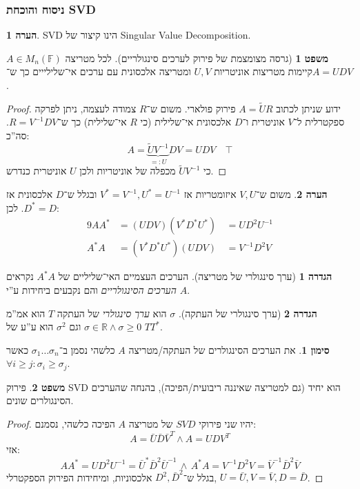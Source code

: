 \documentclass[a4paper]{article}
\newcommand\R     {\mathbb{R}}
\newcommand\F         {\mathbb{F}}
\newcommand\co        {\colon}
\newcommand\sg        {\sigma}
\newcommand\tl    {\tilde}
\newcommand\op    {^{-1}}
\theoremstyle{definition}
\newtheorem{Theorem}{\color{myblue}משפט}
\newtheorem{Definition}{\color{mygreen}הגדרה}
\newtheorem{Remark}{\color{mycyan}הערה}
\newtheorem{Notion}{\color{myred}סימון}
\newcommand\rmark [1] {\begin{Remark}#1\end{Remark}}
\newcommand\noti  [1] {\begin{Notion}#1\end{Notion}}
\begin{document}
	\subsubsection{ניסוח והוכחת SVD}
	\rmark{SVD הינו קיצור של Singular Value Decomposition. }
	\begin{Theorem}[גרסה מצומצמת של פירוק לערכים סינגולריים]
		לכל מטריצה $A \in M_n(\F)$ קיימות מטריצות אוניטריות $U, V$ ומטריצה אלכסונית עם ערכים אי־שלילייים כך ש־$A = UDV$. 
	\end{Theorem}
	\begin{proof}
		ידוע שניתן לכתוב $A = \tl UR$ פירוק פולארי. משום ש־$R$ צמודה לעצמה, ניתן לפרקה ספקטרלית ל־$V$ אוניטרית ו־$D$ אלכסונית אי־שלילית (כי $R$ אי־שלילית) כך ש־$R = V\op DV$. סה''כ: 
		\[ A = \underbrace{\tl UV\op}_{=: U} DV = UDV \quad \top \]
		כי $\tl UV\op$ מכפלה של אוניטריות ולכן $U$ אוניטרית כנדרש. 
	\end{proof}
	
	\rmark{משום ש־$V, U$ איזומטריות אז $V^* = V\op, U^* = U\op$ ובגלל ש־$D$ אלכסונית אז $D^* = D$. לכן: 
		\begin{alignat*}{9}
			AA^* &= (UDV) (V^*D^*U^*)\, &= UD^2U\op \\
			A^*A &= (V^*D^*U^*)(UDV)\, &= V\op D^2 V
	\end{alignat*}}
	
	\begin{Definition}[ערך סינגולרי של מטריצה]
		הערכים העצמיים האי־שליליים של $A^*A$ נקראים \textit{הערכים הסינגולריים} והם נקבעים ביחידות ע''י $A$. 
	\end{Definition}
	\begin{Definition}[ערך סינגולרי של העתקה]
		$\sg$ הוא \textit{ערך סינגולרי} של העתקה $T$ הוא אמ''מ $\sg \in \R \land \sg \ge 0$ וגם $\sg^{2}$ הוא ע''ע של $TT^*$. 
	\end{Definition}
	\noti{את הערכים הסינגולרים של העתקה/מטריצה $A$ כלשהי נסמן ב־$\sg_1 \dots \sg_n$ כאשר $\forall i \ge j \co \sg_i \ge \sg_j$. }
	
	\begin{Theorem}
		פירוק SVD הוא יחיד (גם למטריצה שאיננה ריבועית/הפיכה), בהנחה שהערכים הסינגולרים שונים. 
	\end{Theorem}
	\begin{proof}
		יהיו שני פירוקי $SVD$ של מטריצה $A$ הפיכה כלשהי, נסמנם: 
		\[ A = \bar U \bar D \bar V^T \land A = UDV^T \]
		אזי: 
		\[ AA^* = UD^2 U\op = \bar U^* \bar D^2 \bar U\op \,\land\, A^*A = V\op D^2 V = \bar V\op \bar D^2 \bar V \]
		בגלל ש־$D^2, \bar D^2$ אלכסוניות, ומיחידות הפירוק הספקטרלי, $U = \bar U, V = \bar V, D = \bar D$. 
	\end{proof}
	
\end{document}
